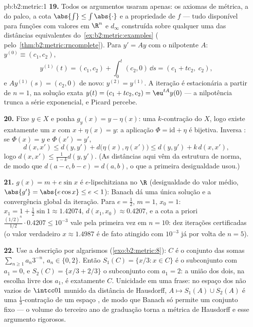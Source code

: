 \begin{solution}{pb:b2:metric:1}
\textbf{19.} Todos os argumentos usaram apenas: os axiomas de métrica, a
 do palco, a cota $\abs{\int} \leq
\int\abs{\cdot}$ e a propriedade  de $f$ --- tudo
disponível para funções com valores em $\R^n$ e $d_\infty$ construída
sobre qualquer uma das distâncias equivalentes do~\cref{ex:b2:metric:examples}
( pelo~\cref{thm:b2:metric:rncomplete}). Para $y' = Ay$
com o nilpotente $A$: $y^{(0)} \equiv (c_1, c_2)$,
\[
y^{(1)}(t) = (c_1, c_2) + \int_0^t (c_2, 0)\,\dd s
= (c_1 + tc_2,\; c_2),
\]
e $Ay^{(1)}(s) = (c_2, 0)$ de novo: $y^{(2)} = y^{(1)}$. A
iteração é estacionária a partir de $n = 1$, na solução exata
$y(t) = (c_1 + tc_2, c_2) = \eu^{tA}y(0)$ --- a nilpotência
trunca a série exponencial, e Picard percebe.

\textbf{20.} Fixe $y \in X$ e ponha $g_y(x) = y - \eta(x)$: uma
$k$-contração do  $X$, logo existe exatamente um $x$
com $x + \eta(x) = y$: a aplicação $\Phi = \mathrm{id} + \eta$ é
bijetiva. Inversa : se $\Phi(x) = y$ e $\Phi(x') =
y'$,
\[
d(x, x') \leq d(y, y') + d\bigl(\eta(x), \eta(x')\bigr)
\leq d(y, y') + k\,d(x, x'),
\]
logo $d(x, x') \leq \frac{1}{1-k}d(y, y')$. (As distâncias aqui vêm
da estrutura de norma, de modo que $d(a - c, b - c) = d(a, b)$, o que a
primeira desigualdade usou.)

\textbf{21.} $g(x) = m + e\sin x$ é $e$-lipschitziana no
 $\R$ (desigualdade do valor médio, $\abs{g'} = \abs{e\cos x}
\leq e < 1$): Banach dá uma única solução e a
convergência global da iteração. Para $e = \frac12$, $m = 1$, $x_0
= 1$: $x_1 = 1 + \frac12\sin 1 \approx 1.42074$, $d(x_1, x_0)
\approx 0.4207$, e a cota a priori
$\frac{(1/2)^n}{1/2}\cdot 0.4207 \leq 10^{-3}$ vale pela primeira vez em
$n = 10$: dez iterações certificadas (o valor verdadeiro $x \approx
1.4987$ é de fato atingido com $10^{-3}$ já por volta de $n =
5$).

\textbf{22.} Use a descrição por algarismos
(\cref{exo:b2:metric:8}): $C$ é o conjunto das somas
$\sum_{n\geq1}a_n3^{-n}$, $a_n \in \{0, 2\}$. Então $S_1(C) =
\{x/3 : x \in C\}$ é o subconjunto com $a_1 = 0$, e $S_2(C) =
\{x/3 + 2/3\}$ o subconjunto com $a_1 = 2$: a união dos dois, na
escolha livre dos $a_1$, é exatamente $C$. Unicidade em uma
frase: no espaço dos  não vazios de
$\intcc01$ munido da distância de Hausdorff, $A \mapsto
S_1(A) \cup S_2(A)$ é uma $\frac13$-contração de um espaço
, de modo que Banach só permite um conjunto fixo --- o volume do
terceiro ano de graduação torna a métrica de Hausdorff e esse argumento rigorosos.


\end{solution}
